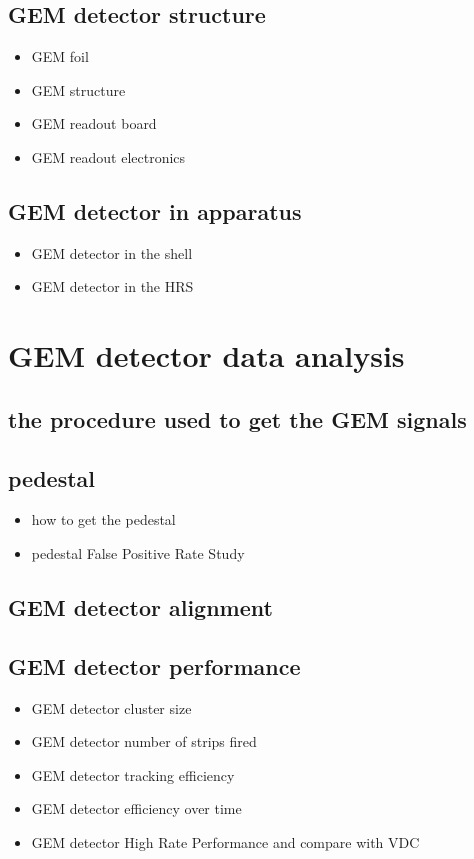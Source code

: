 \subsection{GEM detector structure}
\begin{itemize}
    \item GEM foil
    \item GEM structure 
    \item GEM readout board
    \item GEM readout electronics
\end{itemize}
\subsection{GEM detector in apparatus}
\begin{itemize}
    \item GEM detector in the shell
    \item GEM detector in the HRS
\end{itemize}
\section{GEM detector data analysis}
\subsection{the procedure used to get the GEM signals}
\subsection{pedestal}
\begin{itemize}
    \item how to get the pedestal
    \item pedestal False Positive Rate Study
\end{itemize}
\subsection{GEM detector alignment}
\subsection{GEM detector performance}
\begin{itemize}
    \item GEM detector cluster size
    \item GEM detector number of strips fired
    \item GEM detector tracking efficiency
    \item GEM detector efficiency over time 
    \item GEM detector High Rate Performance and compare with VDC 
\end{itemize}
